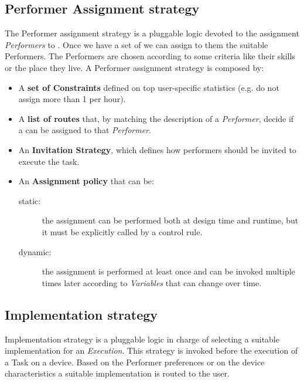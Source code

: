 \subsection{Performer Assignment strategy}
The Performer assignment strategy is a pluggable logic devoted to the assignment
\emph{Performers} to \utask{}. Once we have a set of \utask{} we can assign to
them the suitable Performers. The Performers are chosen according to some
criteria like their skills or the place they live. A Performer assignment
strategy is composed by:
\begin{itemize}
    \item A \textbf{set of Constraints} defined on top user-specific statistics
	(e.g. do not assign more than 1 \utask{} per hour).

    \item A \textbf{list of routes} that, by matching the description of a
    \emph{Performer}, decide if a \utask{} can be assigned to that \emph{Performer}.

    \item An \textbf{Invitation Strategy}, which defines how performers should be 
    invited to execute the task.

    \item An \textbf{Assignment policy} that can be:
        \begin{description}
            \item[static:] the assignment can be performed both at design time and
            runtime, but it must be explicitly called by a control rule.
            \item[dynamic:] the assignment is performed at least once and can be
            invoked multiple times later according to \emph{Variables} that can
            change over time.
        \end{description}
\end{itemize}



\subsection{\utask{} Implementation strategy}
\utask{} Implementation strategy is a pluggable logic in charge of selecting a
suitable \utask{} implementation for an \emph{Execution}. This strategy is invoked
before the execution of a Task on a device. Based on the Performer preferences
or on the device characteristics a suitable \utask{} implementation is routed to
the user.


